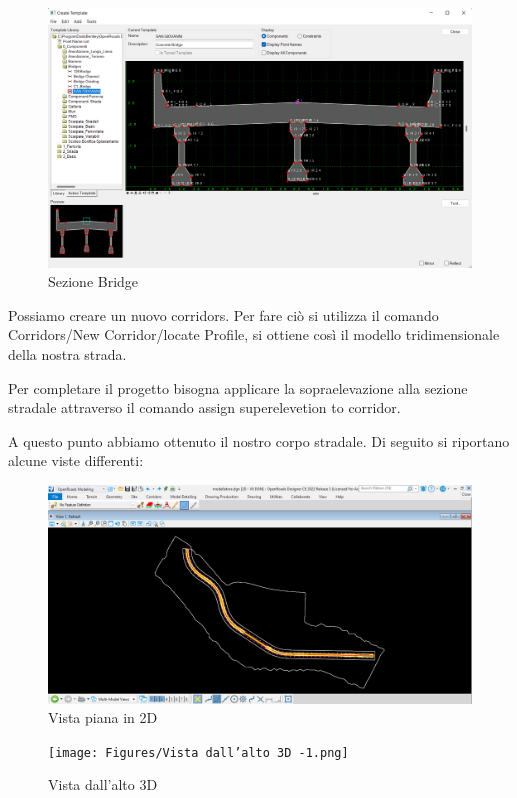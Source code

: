 \begin{figure}[H]
    \includegraphics[width=\textwidth]{Figures/Sezione Bridge.png}
      \caption{Sezione Bridge}
      \label{Sezione Bridge}
\end{figure}

Possiamo creare un nuovo corridors. Per fare ciò si utilizza il comando Corridors/New Corridor/locate Profile, si ottiene così il modello tridimensionale della nostra strada.

Per completare il progetto bisogna applicare la sopraelevazione alla sezione stradale attraverso il comando assign superelevetion to corridor.

A questo punto abbiamo ottenuto il nostro corpo stradale. Di seguito si riportano alcune viste differenti:

\begin{figure}[H]
    \includegraphics[width=\textwidth]{Figures/Vista piana in 2D.png}
      \caption{Vista piana in 2D}
      \label{Vista piana in 2D}
\end{figure}

\begin{figure}[H]
    \texttt{[image: Figures/Vista dall’alto 3D -1.png]}
      \caption{Vista dall’alto 3D}
      \label{Vista dall’alto 3D}
\end{figure}

